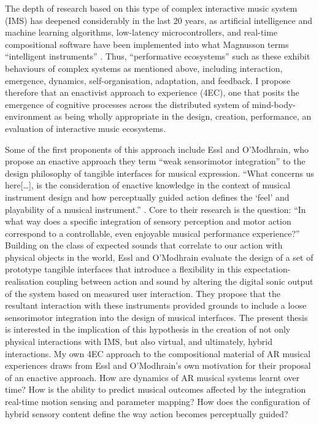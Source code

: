 The depth of research based on this type of complex interactive music system (IMS) has deepened considerably in the last 20 years, as artificial intelligence and machine learning algorithms, low-latency microcontrollers, and real-time compositional software have been implemented into what Magnusson terms “intelligent instruments” \citeyearpar[p. 8]{magnusson2009}. Thus, “performative ecosystems” \citep[]{waters2007} such as these exhibit behaviours of complex systems as mentioned above, including interaction, emergence, dynamics, self-organisation, adaptation, and feedback. I propose therefore that an enactivist approach to experience (4EC), one that posits the emergence of cognitive processes across the distributed system of mind-body-environment as being wholly appropriate in the design, creation, performance, an evaluation of interactive music ecosystems. 

Some of the first proponents of this approach include Essl and O’Modhrain, who propose an enactive approach they term “weak sensorimotor integration” to the design philosophy of tangible interfaces for musical expression. “What concerns us here[…], is the consideration of enactive knowledge in the context of musical instrument design and how perceptually guided action defines the ‘feel’ and playability of a musical instrument.” \citeyearpar[p. 3]{essl2006}. Core to their research is the question: “In what way does a specific integration of sensory perception and motor action correspond to a controllable, even enjoyable musical performance experience?” Building on the class of expected sounds that correlate to our action with physical objects in the world, Essl and O’Modhrain evaluate the design of a set of prototype tangible interfaces that introduce a flexibility in this expectation-realisation coupling between action and sound by altering the digital sonic output of the system based on measured user interaction. They propose that the resultant interaction with these instruments provided grounds to include a loose sensorimotor integration into the design of musical interfaces. The present thesis is interested in the implication of this hypothesis in the creation of not only physical interactions with IMS, but also virtual, and ultimately, hybrid interactions. My own 4EC approach to the compositional material of AR musical experiences draws from Essl and O’Modhrain’s own motivation for their proposal of an enactive approach. How are dynamics of AR musical systems learnt over time? How is the ability to predict musical outcomes affected by the integration real-time motion sensing and parameter mapping? How does the configuration of hybrid sensory content define the way action becomes perceptually guided?

